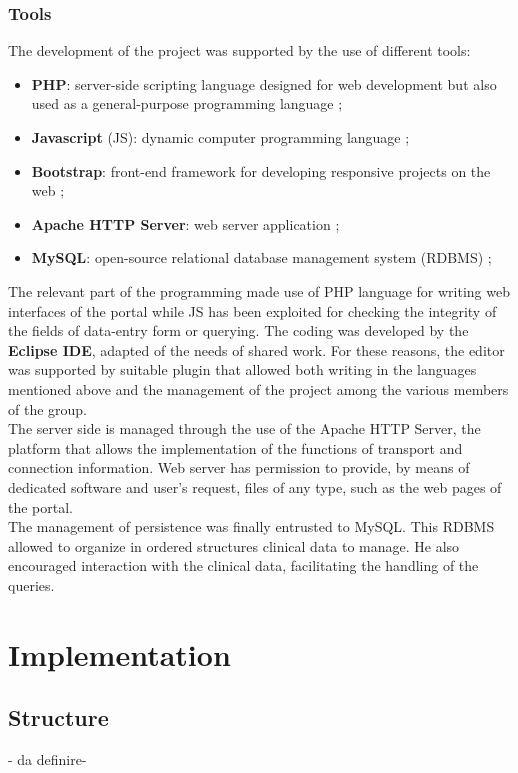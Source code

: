 \documentclass[a4paper]{report}
\begin{document}
\section{Tools}
The development of the project was supported by the use of different tools:
\begin{itemize}
   \item \textbf{PHP}: server-side scripting language designed for web development but also used as a general-purpose programming language \cite{3};
   \item \textbf{Javascript} (JS): dynamic computer programming language \cite{4};
   \item \textbf{Bootstrap}: front-end framework for developing responsive projects on the web \cite{5};
   \item \textbf{Apache HTTP Server}:  web server application \cite{6};
   \item \textbf{MySQL}: open-source relational database management system (RDBMS) \cite{7};
\end{itemize} 
The relevant part of the programming made use of PHP language for writing web interfaces of the portal while JS has been exploited for checking the integrity of the fields of data-entry form or querying. The coding was developed by the \textbf{Eclipse IDE}, adapted of the needs of shared work. For these reasons, the editor was supported by suitable plugin that allowed both writing in the languages mentioned above and the management of the project among the various members of the group.\\
The server side is managed through the use of the Apache HTTP Server, the platform that allows the implementation of the functions of transport and connection information. Web server has permission to provide, by means of dedicated software and user's request, files of any type, such as the web pages of the portal.\\
The management of persistence was finally entrusted to MySQL. This RDBMS allowed to organize in ordered structures clinical data to manage. He also encouraged interaction with the clinical data, facilitating the handling of the queries.


\part{Implementation}

\chapter{Structure}
- da definire-
\end{document}
